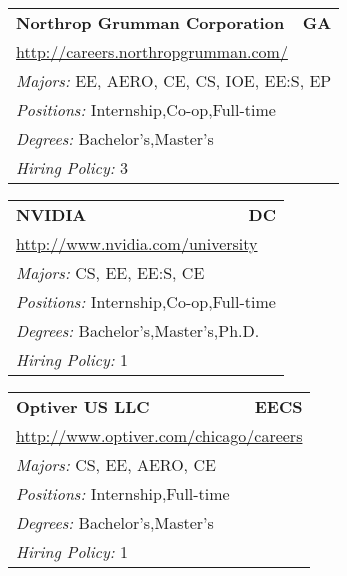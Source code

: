 \documentclass[twoside]{article}
\begin{document}
\begin{center}
\begin{multicols}{3}
\begin{FlushLeft}
\begin{minipage}{\columnwidth}
\end{minipage}
 
\begin{minipage}{\columnwidth}\begin{tabularx}{.95\columnwidth}{Xr}
                 {\Large\bf Northrop Grumman Corporation} & {\Large\bf GA}\\
    \multicolumn{2}{p{.95\columnwidth}}{\url{http://careers.northropgrumman.com/}}\\
    \multicolumn{2}{p{.95\columnwidth}}{\emph{Majors:} EE, AERO, CE, CS, IOE, EE:S, EP}\\
    \multicolumn{2}{p{.95\columnwidth}}{\emph{Positions:} Internship,Co-op,Full-time}\\
    \multicolumn{2}{p{.95\columnwidth}}{\emph{Degrees:} Bachelor's,Master's}\\
    \multicolumn{2}{p{.95\columnwidth}}{\emph{Hiring Policy:} 3}\\
    \end{tabularx}
    
\end{minipage}
 
\begin{minipage}{\columnwidth}\begin{tabularx}{.95\columnwidth}{Xr}
                 {\Large\bf NVIDIA} & {\Large\bf DC}\\
    \multicolumn{2}{p{.95\columnwidth}}{\url{http://www.nvidia.com/university}}\\
    \multicolumn{2}{p{.95\columnwidth}}{\emph{Majors:} CS, EE, EE:S, CE}\\
    \multicolumn{2}{p{.95\columnwidth}}{\emph{Positions:} Internship,Co-op,Full-time}\\
    \multicolumn{2}{p{.95\columnwidth}}{\emph{Degrees:} Bachelor's,Master's,Ph.D.}\\
    \multicolumn{2}{p{.95\columnwidth}}{\emph{Hiring Policy:} 1}\\
    \end{tabularx}
    
\end{minipage}
 
\begin{minipage}{\columnwidth}\begin{tabularx}{.95\columnwidth}{Xr}
                 {\Large\bf Optiver US LLC} & {\Large\bf EECS}\\
    \multicolumn{2}{p{.95\columnwidth}}{\url{http://www.optiver.com/chicago/careers}}\\
    \multicolumn{2}{p{.95\columnwidth}}{\emph{Majors:} CS, EE, AERO, CE}\\
    \multicolumn{2}{p{.95\columnwidth}}{\emph{Positions:} Internship,Full-time}\\
    \multicolumn{2}{p{.95\columnwidth}}{\emph{Degrees:} Bachelor's,Master's}\\
    \multicolumn{2}{p{.95\columnwidth}}{\emph{Hiring Policy:} 1}\\
    \end{tabularx}
    

\end{minipage}
\end{FlushLeft}
\end{multicols}
\end{center}
\end{document}
